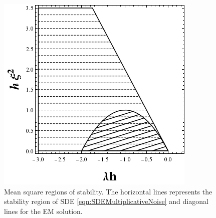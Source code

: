 		\begin{figure}[htb]
			\centering
			\includegraphics[scale=0.6]{Preliminaries/figures/StabilityPlotsMultiplicativeEM.png}
			\caption{Mean square regions of stability. The horizontal lines represents the stability region of
				SDE \eqref{eqn:SDEMultiplicativeNoise} and diagonal lines for the EM solution.
			}
			\label{fig:StabilityPlotsMultiplicativeEM}
		\end{figure}
			
